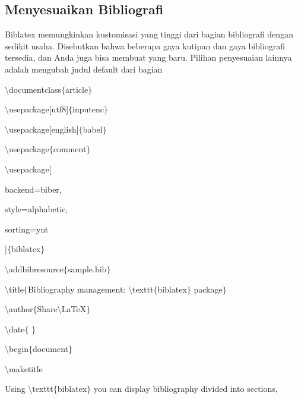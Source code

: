 \begin{itemize}
\vspace{12pt}
\subsection{Menyesuaikan Bibliografi}
\vspace{\baselineskip}
Biblatex memungkinkan kustomisasi yang tinggi dari bagian bibliografi dengan sedikit usaha. Disebutkan bahwa beberapa gaya kutipan dan gaya bibliografi tersedia, dan Anda juga bisa membuat yang baru. Pilihan penyesuaian lainnya adalah mengubah judul default dari bagian ~ \par
\vspace{\baselineskip}
 $\setminus$documentclass$ \{ $article$ \} $\par

$\setminus$usepackage[utf8]$ \{ $inputenc$ \} $\par

$\setminus$usepackage[english]$ \{ $babel$ \} $\par

$\setminus$usepackage$ \{ $comment$ \} $\par

$\setminus$usepackage[\par

backend=biber,\par

style=alphabetic,\par

sorting=ynt\par

]$ \{ $biblatex$ \} $\par

\vspace{\baselineskip}
$\setminus$addbibresource$ \{ $sample.bib$ \} $\par

$\setminus$title$ \{ $Bibliography management: $\setminus$texttt$ \{ $biblatex$ \} $ package$ \} $\par

$\setminus$author$ \{ $Share$\setminus$LaTeX$ \} $\par

$\setminus$date$ \{ $ $ \} $\par

$\setminus$begin$ \{ $document$ \} $\par

$\setminus$maketitle\par
\vspace{\baselineskip}
Using $\setminus$texttt$ \{ $biblatex$ \} $ you can display bibliography divided into sections, \par


\end{itemize}

